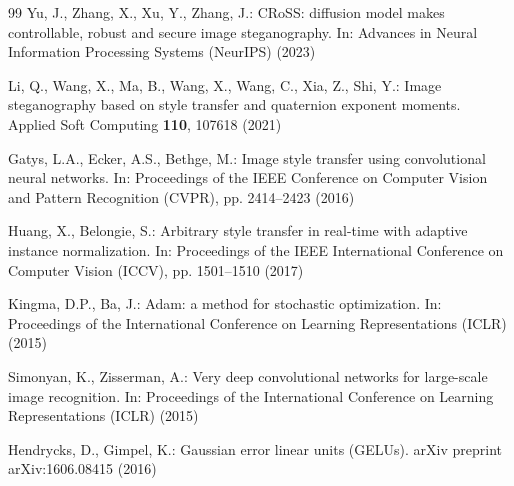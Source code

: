 \documentclass[runningheads]{llncs}
\begin{document}
\begin{thebibliography}{99}
Yu, J., Zhang, X., Xu, Y., Zhang, J.: CRoSS: diffusion model makes controllable, robust and secure image steganography. In: Advances in Neural Information Processing Systems (NeurIPS) (2023)

Li, Q., Wang, X., Ma, B., Wang, X., Wang, C., Xia, Z., Shi, Y.: Image steganography based on style transfer and quaternion exponent moments. Applied Soft Computing \textbf{110}, 107618 (2021)

Gatys, L.A., Ecker, A.S., Bethge, M.: Image style transfer using convolutional neural networks. In: Proceedings of the IEEE Conference on Computer Vision and Pattern Recognition (CVPR), pp. 2414--2423 (2016)

Huang, X., Belongie, S.: Arbitrary style transfer in real-time with adaptive instance normalization. In: Proceedings of the IEEE International Conference on Computer Vision (ICCV), pp. 1501--1510 (2017)

Kingma, D.P., Ba, J.: Adam: a method for stochastic optimization. In: Proceedings of the International Conference on Learning Representations (ICLR) (2015)

Simonyan, K., Zisserman, A.: Very deep convolutional networks for large-scale image recognition. In: Proceedings of the International Conference on Learning Representations (ICLR) (2015)

Hendrycks, D., Gimpel, K.: Gaussian error linear units (GELUs). arXiv preprint arXiv:1606.08415 (2016)

\end{thebibliography}
\end{document}
